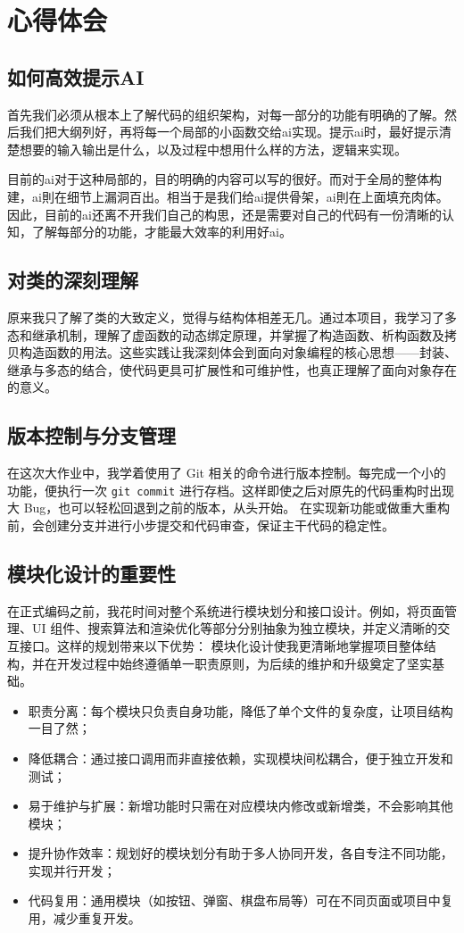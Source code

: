 \documentclass[12pt, a4paper]{article}
\begin{document}
\section{心得体会}
\subsection{如何高效提示AI}
首先我们必须从根本上了解代码的组织架构，对每一部分的功能有明确的了解。然后我们把大纲列好，再将每一个局部的小函数交给ai实现。提示ai时，最好提示清楚想要的输入输出是什么，以及过程中想用什么样的方法，逻辑来实现。

目前的ai对于这种局部的，目的明确的内容可以写的很好。而对于全局的整体构建，ai則在细节上漏洞百出。相当于是我们给ai提供骨架，ai則在上面填充肉体。因此，目前的ai还离不开我们自己的构思，还是需要对自己的代码有一份清晰的认知，了解每部分的功能，才能最大效率的利用好ai。

\subsection{对类的深刻理解}
原来我只了解了类的大致定义，觉得与结构体相差无几。通过本项目，我学习了多态和继承机制，理解了虚函数的动态绑定原理，并掌握了构造函数、析构函数及拷贝构造函数的用法。这些实践让我深刻体会到面向对象编程的核心思想——封装、继承与多态的结合，使代码更具可扩展性和可维护性，也真正理解了面向对象存在的意义。

\subsection{版本控制与分支管理}
在这次大作业中，我学着使用了 Git 相关的命令进行版本控制。每完成一个小的功能，便执行一次 \texttt{git commit} 进行存档。这样即使之后对原先的代码重构时出现大 Bug，也可以轻松回退到之前的版本，从头开始。
在实现新功能或做重大重构前，会创建分支并进行小步提交和代码审查，保证主干代码的稳定性。

\subsection{模块化设计的重要性}
在正式编码之前，我花时间对整个系统进行模块划分和接口设计。例如，将页面管理、UI 组件、搜索算法和渲染优化等部分分别抽象为独立模块，并定义清晰的交互接口。这样的规划带来以下优势：
模块化设计使我更清晰地掌握项目整体结构，并在开发过程中始终遵循单一职责原则，为后续的维护和升级奠定了坚实基础。
\begin{itemize}
  \item 职责分离：每个模块只负责自身功能，降低了单个文件的复杂度，让项目结构一目了然；
  \item 降低耦合：通过接口调用而非直接依赖，实现模块间松耦合，便于独立开发和测试；
  \item 易于维护与扩展：新增功能时只需在对应模块内修改或新增类，不会影响其他模块；
  \item 提升协作效率：规划好的模块划分有助于多人协同开发，各自专注不同功能，实现并行开发；
  \item 代码复用：通用模块（如按钮、弹窗、棋盘布局等）可在不同页面或项目中复用，减少重复开发。
\end{itemize}
\end{document}
